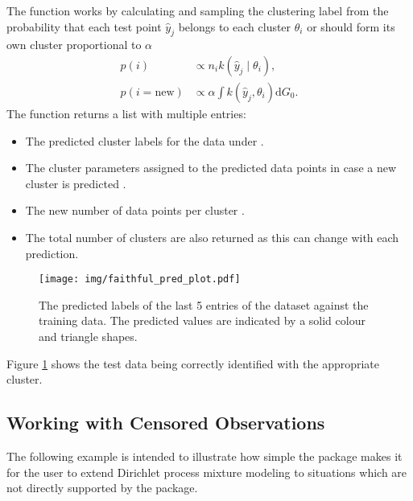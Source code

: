 \documentclass[nojss]{jss}
\begin{document}
The function  works by calculating and sampling the clustering label from the probability that each test point $\hat{y} _j$ belongs to each cluster $\theta _i$ or should form its own cluster proportional to $\alpha$
\begin{align*}
p(i) & \propto n_i k(\hat{y} _j \mid \theta _i), \\
p(i=\text{new}) & \propto \alpha \int k(\hat{y} _j , \theta _i) \mathrm{d} G_0.
\end{align*}
The function returns a list with multiple entries:
\begin{itemize}
\item The predicted cluster labels for the data under .
\item The cluster parameters assigned to the predicted data points in case a new cluster is predicted .
\item The new number of data points per cluster .
\item The total number of clusters are also returned  as this can change with each prediction.
\end{itemize}

\begin{figure}[tb]
\centering
	\texttt{[image: img/faithful\_pred\_plot.pdf]}
\caption{The predicted labels of the last 5 entries of the  dataset against the training data. The predicted values are indicated by a solid colour and triangle shapes.}
\label{fig:faithfulpred}
\end{figure}
Figure \ref{fig:faithfulpred} shows the test data being correctly identified with the appropriate cluster.




\subsection{Working with Censored Observations}
The following example is intended to illustrate how simple the  package makes it for the user to extend Dirichlet process mixture modeling to situations which are not directly supported by the package.
\end{document}
